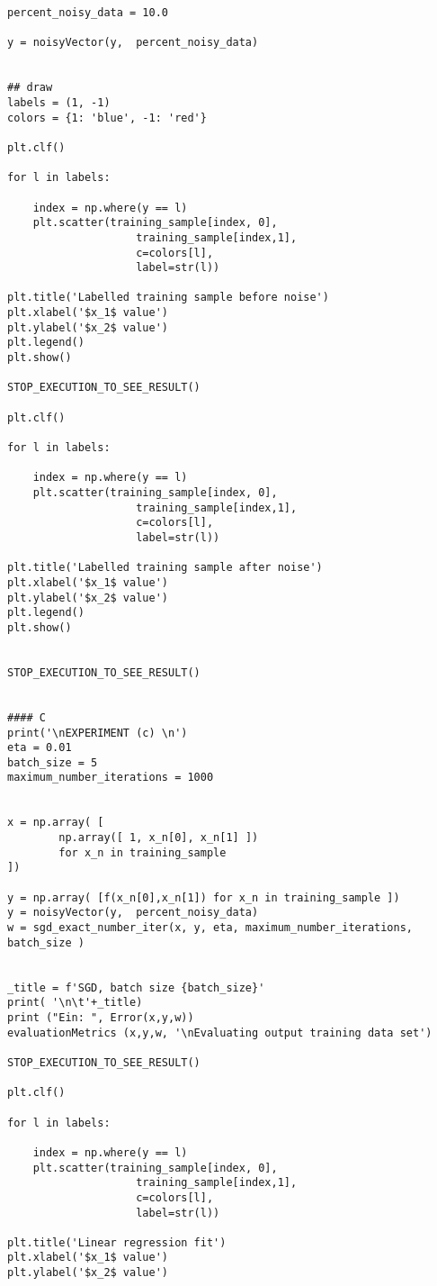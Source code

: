\begin{verbatim}
percent_noisy_data = 10.0

y = noisyVector(y,  percent_noisy_data)

    
## draw
labels = (1, -1)
colors = {1: 'blue', -1: 'red'}

plt.clf()

for l in labels:
	
	index = np.where(y == l)
	plt.scatter(training_sample[index, 0],
                    training_sample[index,1],
                    c=colors[l],
                    label=str(l))

plt.title('Labelled training sample before noise')
plt.xlabel('$x_1$ value')
plt.ylabel('$x_2$ value')
plt.legend()
plt.show()

STOP_EXECUTION_TO_SEE_RESULT()

plt.clf()

for l in labels:
	
	index = np.where(y == l)
	plt.scatter(training_sample[index, 0],
                    training_sample[index,1],
                    c=colors[l],
                    label=str(l))

plt.title('Labelled training sample after noise')
plt.xlabel('$x_1$ value')
plt.ylabel('$x_2$ value')
plt.legend()
plt.show()


STOP_EXECUTION_TO_SEE_RESULT()


#### C
print('\nEXPERIMENT (c) \n')
eta = 0.01
batch_size = 5
maximum_number_iterations = 1000


x = np.array( [
        np.array([ 1, x_n[0], x_n[1] ])
        for x_n in training_sample
])

y = np.array( [f(x_n[0],x_n[1]) for x_n in training_sample ])
y = noisyVector(y,  percent_noisy_data)
w = sgd_exact_number_iter(x, y, eta, maximum_number_iterations, batch_size )


_title = f'SGD, batch size {batch_size}'
print( '\n\t'+_title)
print ("Ein: ", Error(x,y,w))
evaluationMetrics (x,y,w, '\nEvaluating output training data set')

STOP_EXECUTION_TO_SEE_RESULT()

plt.clf()

for l in labels:
	
	index = np.where(y == l)
	plt.scatter(training_sample[index, 0],
                    training_sample[index,1],
                    c=colors[l],
                    label=str(l))

plt.title('Linear regression fit')
plt.xlabel('$x_1$ value')
plt.ylabel('$x_2$ value')


\end{verbatim}
